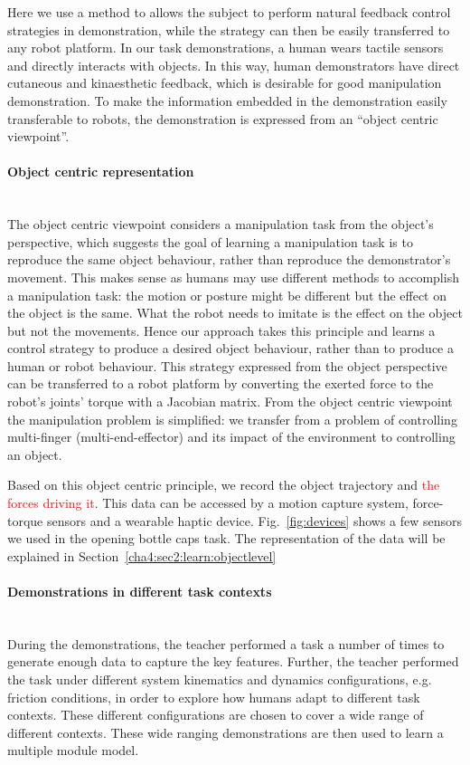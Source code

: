 Here we use a method to allows the subject to perform natural feedback control strategies in demonstration, while the strategy can then be easily transferred to any robot platform. In our task demonstrations, a human wears tactile sensors and directly interacts with objects. In this way, human demonstrators have direct cutaneous and kinaesthetic feedback, which is desirable for good manipulation demonstration. To make the information embedded in the demonstration easily transferable to robots, the demonstration is expressed from an ``object centric viewpoint''.


\paragraph{Object centric representation} ~\\
The object centric viewpoint considers a manipulation task from the object's perspective, which suggests the goal of learning a manipulation task is to reproduce the same object behaviour, rather than reproduce the demonstrator's movement. This makes sense as humans may use different methods to accomplish a manipulation task: the motion or posture might be different but the effect on the object is the same. What the robot needs to imitate is the effect on the object but not the movements.
Hence our approach takes this principle and learns a control strategy to produce a desired object behaviour, rather than to produce a human or robot behaviour. This strategy expressed from the object perspective can be transferred to a robot platform by converting the exerted force to the robot's joints' torque with a Jacobian matrix. From the object centric viewpoint the manipulation problem is simplified: we transfer from a problem of controlling multi-finger (multi-end-effector) and its impact of the environment to controlling an object.

Based on this object centric principle, we record the object trajectory and \textcolor{red}{the forces driving it}. This data can be accessed by a motion capture system, force-torque sensors and a wearable haptic device. Fig.~\ref{fig:devices} shows a few sensors we used in the opening bottle caps task. The representation of the data will be explained in Section~\ref{cha4:sec2:learn:objectlevel}


\paragraph{Demonstrations in different task contexts}  ~\\
During the demonstrations, the teacher performed a task a number of times to generate enough data to capture the key features. Further, the teacher performed the task under different system kinematics and dynamics configurations, e.g. friction conditions, in order to explore how humans adapt to different task contexts. These different configurations are chosen to cover a wide range of different contexts. These wide ranging demonstrations are then used to learn a multiple module model.





